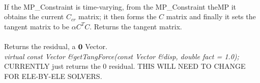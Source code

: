  \\
If the MP\_Constraint is time-varying, from the MP\_Constraint
\p theMP it obtains the current $C_{cr}$ matrix; it then forms the
$C$ matrix and finally it sets the tangent matrix to be $\alpha
C^TC$. Returns the tangent matrix. \\

 \\
Returns the residual, a ${\bf 0}$ Vector. \\

{\em virtual const Vector \&getTangForce(const Vector \&disp, double
fact = 1.0);    }\\
CURRENTLY just returns the $0$ residual. THIS WILL NEED TO CHANGE FOR
ELE-BY-ELE SOLVERS. 

